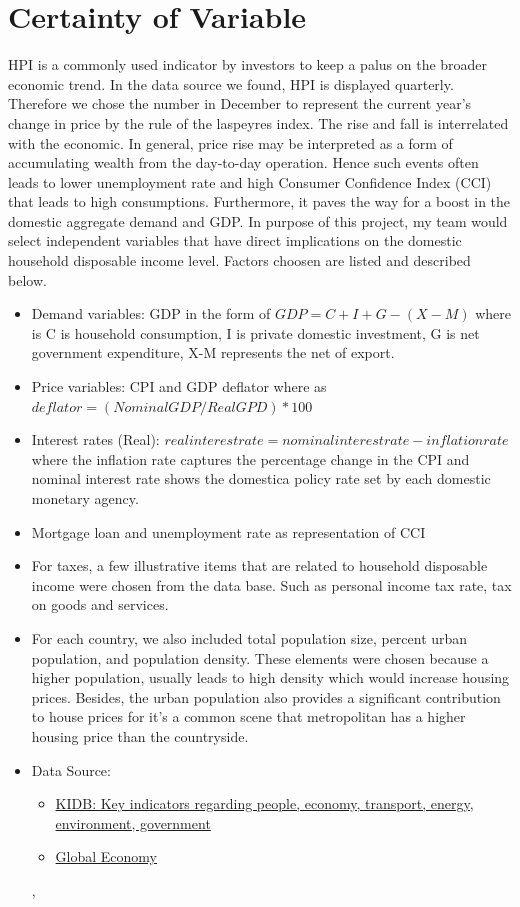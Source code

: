 \documentclass[11pt]{article}
\begin{document}
\section{Certainty of Variable}\label{section-Certainty}
HPI is a commonly used indicator by investors to keep a palus on the broader economic trend. In the data source we found, HPI is displayed quarterly. Therefore we chose the number in December to represent the current year's change in price by the rule of the laspeyres index. The rise and fall is interrelated with the economic. In general, price rise may be interpreted as a form of accumulating wealth from the day-to-day operation. Hence such events often leads to lower unemployment rate and high Consumer Confidence Index (CCI) that leads to high consumptions. Furthermore, it paves the way for a boost in the domestic aggregate demand and GDP\citep{aei297454}. In purpose of this project, my team would select independent variables that have direct implications on the domestic household disposable income level. Factors choosen are listed and described below. 
\begin{itemize}
\item Demand variables: GDP in the form of \(GDP = C + I + G - (X-M)\) where is C is household consumption, I is private domestic investment, G is net government expenditure, X-M represents the net of export. 
\item Price variables: CPI and GDP deflator where as \(deflator = (Nominal GDP / Real GPD) * 100 \)
\item Interest rates (Real): \(real interest rate = nominal interest rate - inflation rate\) where the inflation rate captures the percentage change in the CPI and nominal interest rate shows the domestica policy rate set by each domestic monetary agency. 
\item Mortgage loan and unemployment rate as representation of CCI
\item For taxes, a few illustrative items that are related to household disposable income were chosen from the data base. Such as personal income tax rate, tax on goods and services.
\item For each country, we also included total population size, percent urban population, and population density. These elements were chosen because a higher population, usually leads to high density which would increase housing prices. Besides, the urban population also provides a significant contribution to house prices for it's a common scene that metropolitan has a higher housing price than the countryside.
\item Data Source: 
    \begin{itemize}
        \item \href{https://kidb.adb.org/kidb/onlineQuery}{KIDB: Key indicators regarding people, economy, transport, energy, environment, government}
        \item \href{https://www.theglobaleconomy.com/}{Global Economy}
    \end{itemize}

, 
\end{itemize}     




\end{document}
